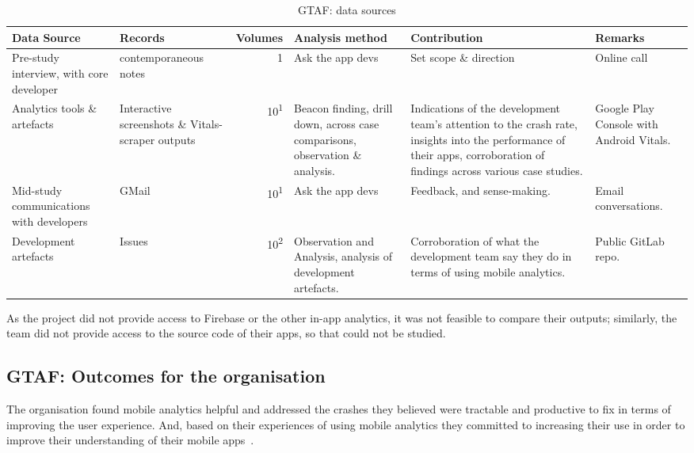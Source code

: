 \begin{table*}
    \centering
    \footnotesize
    \tabcolsep=0.12cm
    \begin{tabular}{p{2.4cm}p{2.4cm}r>{\raggedright}p{2.4cm}>{\raggedright}p{3cm}>{\raggedright\arraybackslash}p{2.5cm}}
        Data Source & Records & Volumes & Analysis method &Contribution & Remarks \\
        \toprule
         Pre-study interview, with core developer & contemporaneous notes\footnotemark & 1 & Ask the app devs & Set scope \& direction & Online call \\
         Analytics tools \& artefacts &Interactive screenshots \& Vitals-scraper outputs &10\textsuperscript{1} & Beacon finding, drill down, across case comparisons, observation \& analysis. & Indications of the development team's attention to the crash rate, insights into the performance of their apps, corroboration of findings across various case studies. & Google Play Console with Android Vitals. \\         
         Mid-study communications with developers & GMail & 10\textsuperscript{1} & Ask the app devs & Feedback, and sense-making.  & Email conversations. \\
         Development artefacts  & Issues & 10\textsuperscript{2} & Observation and Analysis, analysis of development artefacts. & Corroboration of what the development team say they do in terms of using mobile analytics. & Public GitLab repo. \\
         \bottomrule
    \end{tabular}
    \caption{GTAF: data sources}
    \label{tab:gtaf-data-sources}
\end{table*}



As the project did not provide access to Firebase or the other in-app analytics, it was not feasible to compare their outputs; similarly, the team did not provide access to the source code of their apps, so that could not be studied.


\subsection{GTAF: Outcomes for the organisation}
The organisation found mobile analytics helpful and addressed the crashes they believed were tractable and productive to fix in terms of improving the user experience. And, based on their experiences of using mobile analytics they committed to increasing their use in order to improve their understanding of their mobile apps~.


